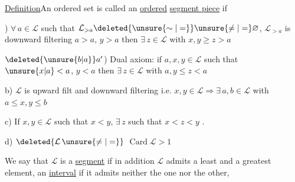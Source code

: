 


\uline{Definition}\quad An ordered set  is called an \uline{ordered} \uline{segment piece} if

) $\forall\,a\in\mathcal L$ such that $\mathcal L_{>a}\deleted{\unsure{\sim|=}}\unsure{\ne|=}\varnothing$, $\mathcal L_{>a}$ is downward filtering
 
$a>a$, $y>a$ then $\exists\,z\in\mathcal L$ with $x,y\geq z>a$

$\deleted{\unsure{b|a}}a'$) Dual axiom: if $a,x,y\in\mathcal L$ such that
$\unsure{x|a}<a$, $y<a$ then $\exists\,z\in\mathcal L$ with $a,y\leq z<a$

b) $\mathcal L$ is upward filt and downward filtering i.e.
$x,y\in\mathcal L\Rightarrow\exists\,a,b\in\mathcal L$ with $a\leq x,y\leq b$

c) If $x,y\in\mathcal L$ such that $x<y$, $\exists\,z$ such that $x<z<y$ .

d) $\deleted{\mathcal L\,\unsure{\ne|=}}$ $\operatorname{Card}\mathcal L>1$ 


We say that $\mathcal L$ is a \uline{segment} if in addition $\mathcal L$ admits a least and
 a greatest element, an \uline{interval} if it admits neither the one nor the other,


